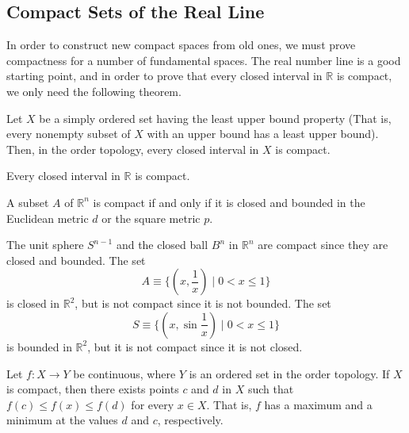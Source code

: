 \subsection{Compact Sets of the Real Line}

  In order to construct new compact spaces from old ones, we must prove compactness for a number of fundamental spaces. The real number line is a good starting point, and in order to prove that every closed interval in $\mathbb{R}$ is compact, we only need the following theorem. 

  \begin{theorem}
    Let $X$ be a simply ordered set having the least upper bound property (That is, every nonempty subset of $X$ with an upper bound has a least upper bound). Then, in the order topology, every closed interval in $X$ is compact. 
  \end{theorem}

  \begin{corollary}
    Every closed interval in $\mathbb{R}$ is compact. 
  \end{corollary}

  \begin{theorem}
    A subset $A$ of $\mathbb{R}^n$ is compact if and only if it is closed and bounded in the Euclidean metric $d$ or the square metric $p$. 
  \end{theorem}

  \begin{example}
    The unit sphere $S^{n-1}$ and the closed ball $B^n$ in $\mathbb{R}^n$ are compact since they are closed and bounded. The set
    \begin{equation}
      A \equiv \{(x, \frac{1}{x}) \; | \; 0 < x \leq 1\}
    \end{equation}
    is closed in $\mathbb{R}^2$, but is not compact since it is not bounded. The set 
    \begin{equation}
      S \equiv \{(x, \sin{\frac{1}{x}}) \; | \; 0<x\leq 1\}
    \end{equation}
    is bounded in $\mathbb{R}^2$, but it is not compact since it is not closed. 
  \end{example}

  \begin{theorem}
    Let $f: X \rightarrow Y$ be continuous, where $Y$ is an ordered set in the order topology. If $X$ is compact, then there exists points $c$ and $d$ in $X$ such that $f(c) \leq f(x) \leq f(d)$ for every $x \in X$. That is, $f$ has a maximum and a minimum at the values $d$ and $c$, respectively. 
  \end{theorem}


